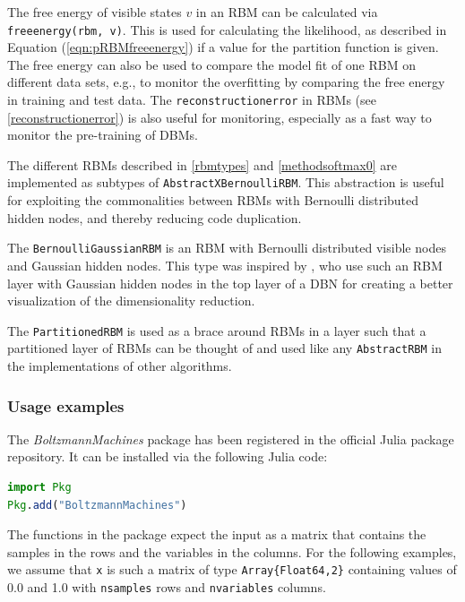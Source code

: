 \documentclass[12pt]{article}
\newcommand{\inlinecode}[1]{\texttt{#1}}
\newcommand{\apkg}[1]{\emph{#1}}
\begin{document}
The free energy of visible states $v$ in an RBM can be calculated via  \inlinecode{freeenergy(rbm, v)}.
This is used for calculating the likelihood, as described in Equation (\ref{eqn:pRBMfreeenergy}) if a value for the partition function is given.
The free energy can also be used to compare the model fit of one RBM on different data sets, e.g., to monitor the overfitting by comparing the free energy in training and test data.
The \inlinecode{reconstructionerror} in RBMs (see \ref{reconstructionerror}) is also useful for monitoring, especially as a fast way to monitor the pre-training of DBMs.

The different RBMs described in \ref{rbmtypes} and \ref{methodsoftmax0} are implemented as subtypes of \inlinecode{AbstractXBernoulliRBM}.
This abstraction is useful for exploiting the commonalities between RBMs with Bernoulli distributed hidden nodes, and thereby reducing code duplication.

The \inlinecode{BernoulliGaussianRBM} is an RBM with Bernoulli distributed visible nodes and Gaussian hidden nodes.
This type was inspired by \cite{hinton_reducing_2006}, who use such an RBM layer with Gaussian hidden nodes in the top layer of a DBN for creating a better visualization of the dimensionality reduction.

The \inlinecode{PartitionedRBM} is used as a brace around RBMs in a layer such that a partitioned layer of RBMs can be thought of and used like any \inlinecode{AbstractRBM} in the implementations of other algorithms.



\subsubsection{Usage examples}\label{bmusage}
The \apkg{BoltzmannMachines} package has been registered in the official Julia package repository. It can be installed via the following Julia code:

\begin{lstlisting}[language=Julia]
import Pkg
Pkg.add("BoltzmannMachines")
\end{lstlisting}

The functions in the package expect the input as a matrix that contains the samples in the rows and the variables in the columns.
For the following examples, we assume that \inlinecode{x} is such a matrix of type \inlinecode{Array\{Float64,2\}} containing values of 0.0 and 1.0 with \inlinecode{nsamples} rows and \inlinecode{nvariables} columns.
\end{document}

